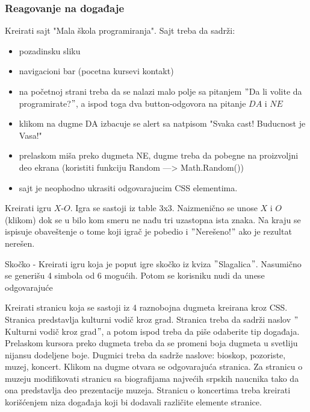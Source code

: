 \subsubsection{Reagovanje na događaje}

\begin{primer}
Kreirati sajt "Mala škola programiranja". Sajt treba da sadrži:
\begin{itemize}
\item pozadinsku sliku
\item navigacioni bar (pocetna kursevi kontakt)
\item na početnoj strani treba da se nalazi malo polje sa pitanjem $"$Da li volite da
     programirate?$"$, a ispod toga dva button-odgovora na pitanje $DA$ i $NE$ 
\item klikom na dugme DA izbacuje se alert sa natpisom "Svaka cast! Buducnost je Vasa!"
\item prelaskom miša preko dugmeta NE, dugme treba da pobegne na proizvoljni deo ekrana
    (koristiti funkciju Random ---> Math.Random())
\item sajt je neophodno ukrasiti odgovarajucim CSS elementima. 
\end{itemize}
\end{primer}

\begin{primer}
Kreirati igru $X$-$O$. Igra se sastoji iz table $3$x$3$. Naizmenično se unose $X$ i $O$ (klikom) dok se u bilo kom smeru ne nađu tri uzastopna ista znaka. Na kraju se ispisuje obaveštenje o tome koji igrač je pobedio i $"$Nerešeno!$"$ ako je rezultat nerešen.
\end{primer}


\begin{primer}
Skočko - Kreirati igru koja je poput igre skočko iz kviza $"$Slagalica$"$. Nasumično se generišu 4 simbola od 6 mogućih. Potom se korisniku nudi da unese odgovarajuće
\end{primer}

\begin{primer}
Kreirati stranicu koja se sastoji iz 4 raznobojna dugmeta kreirana kroz CSS. Stranica predstavlja kulturni vodič kroz grad. Stranica treba da sadrži naslov $"$Kulturni vodič kroz grad$"$, a potom ispod treba da piše odaberite tip događaja. Prelaskom kursora preko dugmeta treba da se promeni boja dugmeta u svetliju nijansu dodeljene boje. Dugmici treba da sadrže naslove: bioskop, pozoriste, muzej, koncert. Klikom na dugme otvara se odgovarajuća stranica. Za stranicu o muzeju modifikovati stranicu sa biografijama najvećih srpskih naucnika tako da ona predstavlja deo prezentacije muzeja. Stranicu o koncertima treba kreirati korišćenjem niza događaja koji bi dodavali različite elemente stranice. 
\end{primer}

